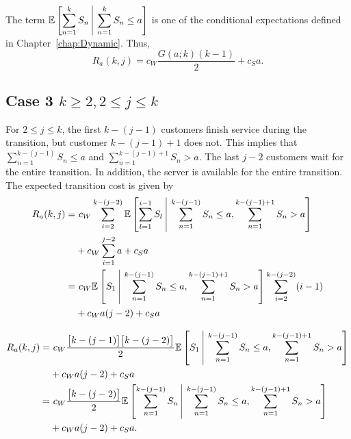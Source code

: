 The term $\displaystyle \mathbb{E} \left[ \sum_{n = 1}^{k} S_{n} \ \vline \ \sum_{n = 1}^{k} S_{n} \leq a \right]$ is one of the conditional expectations defined in Chapter~\ref{chap:Dynamic}. Thus,
\begin{equation}
	R_{a} (k, j) = c_{W} \frac{G (a; k) (k - 1)}{2} + c_{S} a.
\end{equation}

\subsection{Case 3 $k \geq 2, 2 \leq j \leq k$}
For $2 \leq j \leq k$, the first $k - (j - 1)$ customers finish service during the transition, but customer $k - (j - 1) + 1$ does not. This implies that $\displaystyle \sum_{n = 1}^{k - (j - 1)} S_{n} \leq a$ and $\displaystyle \sum_{n = 1}^{k - (j - 1) + 1} S_{n} > a$. The last $j - 2$ customers wait for the entire transition. In addition, the server is available for the entire transition. The expected transition cost is given by
\begin{align*}
	R_{a} (k, j)
	= & \ c_{W} \sum_{i = 2}^{k - (j - 2)} \mathbb{E} \left[ \sum_{l = 1}^{i - 1} S_{l} \ \vline \ \sum_{n = 1}^{k - (j - 1)} S_{n} \leq a, \sum_{n = 1}^{k - (j - 1) + 1} S_{n} > a \right] \\
	& + c_{W} \sum_{i = 1}^{j - 2} a + c_{S} a \\
	= & \ c_{W} \mathbb{E} \left[ S_{1} \ \vline \ \sum_{n = 1}^{k - (j - 1)} S_{n} \leq a, \sum_{n = 1}^{k - (j - 1) + 1} S_{n} > a \right] \sum_{i = 2}^{k - (j - 2)} (i - 1) \\
	& + c_{W} a (j - 2) + c_{S} a
\end{align*}

\begin{equation}
	\begin{split}
		R_{a} (k, j)
		= & \ c_{W} \frac{ \big[ k - (j - 1) \big] \big[ k - (j - 2) \big]}{2} \mathbb{E} \left[ S_{1} \ \vline \ \sum_{n = 1}^{k - (j - 1)} S_{n} \leq a, \sum_{n = 1}^{k - (j - 1) + 1} S_{n} > a \right] \\
		& + c_{W} a (j - 2) + c_{S} a \\
		= & \ c_{W} \frac{ \big[ k - (j - 2) \big]}{2} \mathbb{E} \left[ \sum_{n = 1}^{k - (j - 1)} S_{n} \ \vline \ \sum_{n = 1}^{k - (j - 1)} S_{n} \leq a, \sum_{n = 1}^{k - (j - 1) + 1} S_{n} > a \right] \\
		& + c_{W} a (j - 2) + c_{S} a.
	\end{split}
\end{equation}

